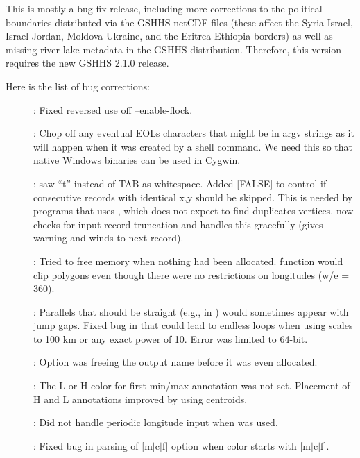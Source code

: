 This is mostly a bug-fix release, including more corrections to the political boundaries distributed
via the GSHHS netCDF files (these affect the Syria-Israel, Israel-Jordan, Moldova-Ukraine, and the
Eritrea-Ethiopia borders) as well as missing river-lake metadata in the GSHHS distribution.
Therefore, this version requires the new GSHHS 2.1.0 release.

Here is the list of bug corrections:
\begin{description}
	\item []:	Fixed reversed use off --enable-flock.
	\item []:	Chop off any eventual EOLs characters that might be in argv
		strings as it will happen when it was created by a shell command.
		We need this so that native Windows binaries can be used in Cygwin.
	\item []:	 saw ``t'' instead of TAB as whitespace.
		Added  [FALSE] to control if consecutive
		records with identical x,y should be skipped.  This is needed
		by programs that uses , which does not expect to
		find duplicates vertices.   now checks for input record truncation and handles
		this gracefully (gives warning and winds to next record).
	\item []:	Tried to free memory when nothing had been allocated.
		 function would clip polygons even though
		there were no restrictions on longitudes (w/e = 360).
	\item []:	Parallels that should be straight (e.g., in ) would sometimes
		appear with jump gaps.  Fixed bug in  that could lead to endless loops
		when using scales to 100 km or any exact power of 10. Error was limited to 64-bit.
	\item []:	Option  was freeing the output name before it was even allocated.
	\item []:	The L or H color for first min/max annotation was not set.
		Placement of H and L annotations improved by using centroids.
	\item []:	Did not handle periodic longitude input when  was used.
	\item []:	Fixed bug in parsing of [m$|$c$|$f] option when color starts with [m$|$c$|$f].

\end{description}
